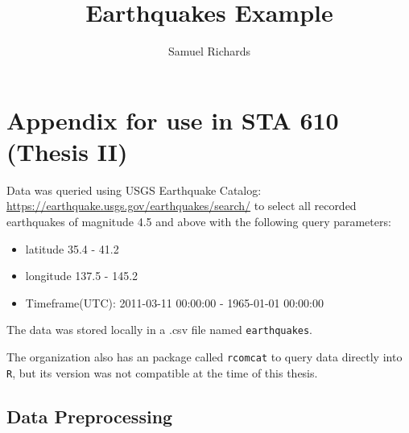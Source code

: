 \documentclass[
]{article}
\title{Earthquakes Example}
\author{Samuel Richards}
\date{}
\providecommand{\tightlist}{%
  \setlength{\itemsep}{0pt}\setlength{\parskip}{0pt}}
\begin{document}
\maketitle

\hypertarget{appendix-for-use-in-sta-610-thesis-ii}{%
\section{Appendix for use in STA 610 (Thesis
II)}\label{appendix-for-use-in-sta-610-thesis-ii}}

Data was queried using USGS Earthquake Catalog:
\url{https://earthquake.usgs.gov/earthquakes/search/} to select all
recorded earthquakes of magnitude 4.5 and above with the following query
parameters:

\begin{itemize}
\tightlist
\item
  latitude 35.4 - 41.2
\item
  longitude 137.5 - 145.2
\item
  Timeframe(UTC): 2011-03-11 00:00:00 - 1965-01-01 00:00:00
\end{itemize}

The data was stored locally in a .csv file named \texttt{earthquakes}.

The organization also has an package called \texttt{rcomcat} to query
data directly into \texttt{R}, but its version was not compatible at the
time of this thesis.

\hypertarget{data-preprocessing}{%
\subsection{Data Preprocessing}\label{data-preprocessing}}
\end{document}
